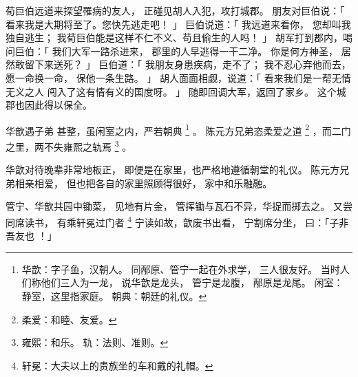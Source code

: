 \begin{paracol}{2}
\switchcolumn

荀巨伯远道来探望罹病的友人，
正碰见胡人入犯，攻打城郡。
朋友对巨伯说：「
    看来我是大期将至了。您快先逃走吧！
」
巨伯说道：「
    我远道来看你，
    您却叫我独自逃生；
    我荀巨伯能是这样不仁不义、苟且偷生的人吗！
」
胡军打到郡内，喝问巨伯：「
    我们大军一路杀进来，
    郡里的人早逃得一干二净。
    你是何方神圣，
    居然敢留下来送死？
」
巨伯道：「
    我朋友身患疾病，走不了；
    我不忍心弃他而去，
    愿一命换一命，
    保他一条生路。
」
胡人面面相觑，说道：「
    看来我们是一帮无情无义之人
    闯入了这有情有义的国度呀。
」
随即回调大军，返回了家乡。
这个城郡也因此得以保全。


\switchcolumn*[\section{}]

华歆遇子弟
甚整，虽闲室之内，严若朝典%
\footnote{%
    华歆：字子鱼，汉朝人。
          同邴原、管宁一起在外求学，
          三人很友好。
          当时人们称他们三人为一龙，
          说华歆是龙头，
          管宁是龙腹，
          邴原是龙尾。
    闲室：静室，这里指家庭。
    朝典：朝廷的礼仪。
}%
。
陈元方兄弟恣柔爱之道%
\footnote{%
    柔爱：和睦、友爱。
}%
，而二门之里，两不失雍熙之轨焉%
\footnote{%
    雍熙：和乐。
    轨：法则、准则。
}%
。

\switchcolumn

华歆对待晚辈非常地板正，
即便是在家里，也严格地遵循朝堂的礼仪。
陈元方兄弟相亲相爱，
但也把各自的家里照顾得很好，
家中和乐融融。


\switchcolumn*[\section{}]

管宁、华歆共园中锄菜，
见地有片金，
管挥锄与瓦石不异，华捉而掷去之。
又尝同席读书，
有乘轩冕过门者%
\footnote{%
    轩冕：大夫以上的贵族坐的车和戴的礼帽。
}%
宁读如故，歆废书出看，
宁割席分坐，
曰：「子非吾友也 ！」

\switchcolumn




\end{paracol}
